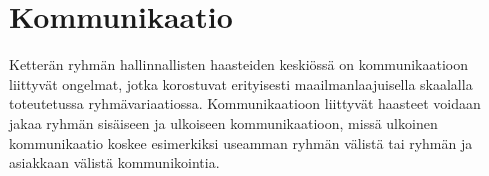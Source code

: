 \chapter{Kommunikaatio}

Ketterän ryhmän hallinnallisten haasteiden keskiössä on kommunikaatioon liittyvät ongelmat, jotka korostuvat erityisesti maailmanlaajuisella skaalalla toteutetussa ryhmävariaatiossa. Kommunikaatioon liittyvät haasteet voidaan jakaa ryhmän sisäiseen ja ulkoiseen kommunikaatioon, missä ulkoinen kommunikaatio koskee esimerkiksi useamman ryhmän välistä tai ryhmän ja asiakkaan välistä kommunikointia. 